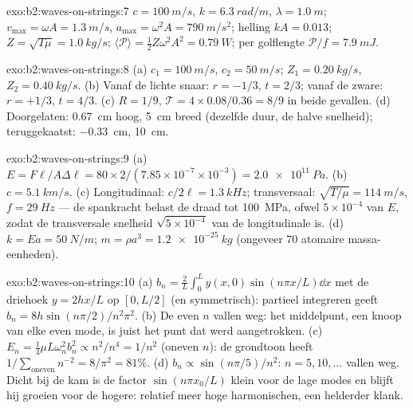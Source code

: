 \begin{solution}{exo:b2:waves-on-strings:7}
$c = \qty{100}{m/s}$, $k = \qty{6.3}{rad/m}$, $\lambda = \qty{1.0}{m}$;
$v_{\max} = \omega A =
\qty{1.3}{m/s}$,
$a_{\max} = \omega^2A = \qty{790}{m/s^2}$; helling $kA = 0.013$;
$Z =
\sqrt{T\mu} = \qty{1.0}{kg/s}$;
$\langle\mathcal P\rangle = \tfrac12Z\omega^2A^2 = \qty{0.79}{W}$; per
golflengte $\mathcal P/f = \qty{7.9}{mJ}$.
\end{solution}

\begin{solution}{exo:b2:waves-on-strings:8}
(a) $c_1 = \qty{100}{m/s}$, $c_2 = \qty{50}{m/s}$; $Z_1 = \qty{0.20}{kg/s}$,
$Z_2 = \qty{0.40}{kg/s}$. (b) Vanaf de lichte snaar: $r = -1/3$, $t = 2/3$;
vanaf de zware: $r =
+1/3$, $t = 4/3$. (c) $R = 1/9$,
$\mathcal T = 4 \times 0.08/0.36 = 8/9$ in beide gevallen. (d) Doorgelaten:
\qty{0.67}{cm} hoog, \qty{5}{cm} breed (dezelfde duur, de halve snelheid);
teruggekaatst: \qty{-0.33}{cm}, \qty{10}{cm}.
\end{solution}

\begin{solution}{exo:b2:waves-on-strings:9}
(a)
$E = F\ell/A\Delta\ell = 80 \times 2/(7.85 \times 10^{-7} \times 10^{-3}) = \qty{2.0e11}{Pa}$.
(b) $c = \qty{5.1}{km/s}$. (c) Longitudinaal: $c/2\ell = \qty{1.3}{kHz}$;
transversaal: $\sqrt{T/\mu} = \qty{114}{m/s}$, $f = \qty{29}{Hz}$ --- de
spankracht belast de draad tot \qty{100}{MPa}, ofwel $5 \times 10^{-4}$ van
$E$, zodat de transversale snelheid $\sqrt{5 \times 10^{-4}}$ van de
longitudinale is. (d) $k = Ea = \qty{50}{N/m}$;
$m
= \rho a^3 = \qty{1.2e-25}{kg}$ (ongeveer $70$ atomaire massa-eenheden).
\end{solution}

\begin{solution}{exo:b2:waves-on-strings:10}
(a) $b_n = \frac2L\int_0^Ly(x, 0)\sin(n\pi x/L)\dd x$ met de driehoek
$y =
2hx/L$ op $[0, L/2]$ (en symmetrisch): partieel integreren geeft
$b_n = 8h\sin(n\pi/2)
/n^2\pi^2$. (b) De even $n$ vallen weg: het
middelpunt, een knoop van elke even mode, is juist het punt dat werd
aangetrokken. (c)
$E_n = \tfrac14\mu L\omega_n^2b_n^2 \propto n^2/n^4 = 1/n^2$ (oneven $n$):
de grondtoon heeft $1/\sum_{\text{oneven}}n^{-2} = 8/\pi^2 = 81\%$. (d)
$b_n \propto \sin(n\pi/5)/n^2$: $n = 5, 10, \dots$ vallen weg. Dicht bij de
kam is de factor $\sin(n\pi x_0/L)$ klein voor de lage modes en blijft hij
groeien voor de hogere: relatief meer hoge harmonischen, een helderder
klank.
\end{solution}

